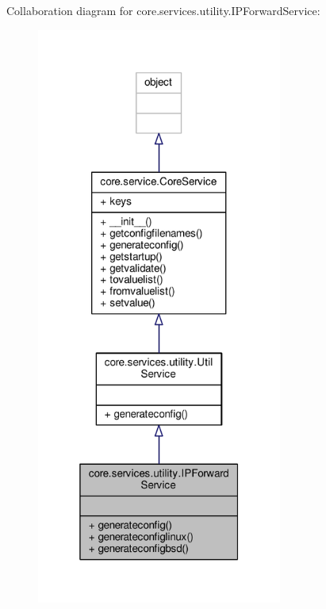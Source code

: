 Collaboration diagram for core.\+services.\+utility.\+I\+P\+Forward\+Service\+:
\nopagebreak
\begin{figure}[H]
\begin{center}
\leavevmode
\includegraphics[width=229pt]{classcore_1_1services_1_1utility_1_1_i_p_forward_service__coll__graph}
\end{center}
\end{figure}
